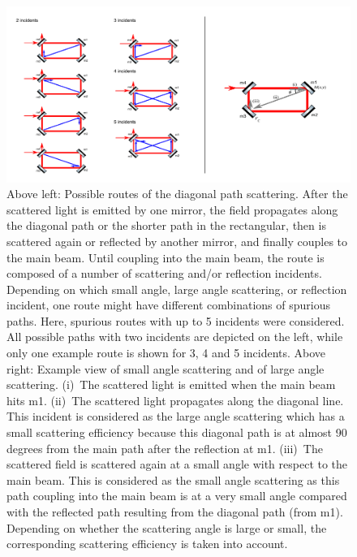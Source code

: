 \begin{figure}
\centering
\includegraphics[scale =0.6]{./Sec_Optics/diagonal1.pdf}
\caption{Above left:
Possible routes of the diagonal path scattering.
After the scattered light is emitted by one mirror,
the field propagates along the diagonal path or the shorter path in the rectangular,
then is scattered again or reflected by another mirror,
and finally couples to the main beam. Until coupling into the main beam,
the route is composed of a number of scattering and/or reflection incidents.
Depending on which small angle, large angle scattering, or reflection incident,
one route might have different combinations of spurious paths.
Here, spurious routes with up to 5 incidents were considered.
All possible paths with two incidents are depicted on the left,
while only one example route is shown for 3, 4 and 5 incidents.
Above right:
Example view of small angle scattering and of large angle scattering.
(i)~The scattered light is emitted when the main beam hits m1.
(ii)~The scattered light propagates along the diagonal line.
This incident is considered as the large angle scattering which has a small
scattering efficiency because this diagonal path
is at almost 90 degrees from the main path after the reflection at m1.
(iii)~The scattered field is scattered again at a small angle
with respect to the main beam. This is considered as the small angle scattering
as this path coupling into the main beam is at a very small angle compared with
the reflected path resulting from the diagonal path (from m1).
Depending on whether the scattering angle is large or small,
the corresponding scattering efficiency is taken into account.}
\label{fig:diagonal1}
\end{figure}


